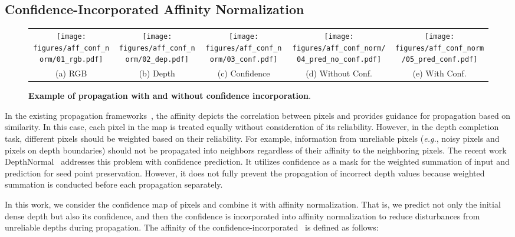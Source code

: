 \documentclass[runningheads]{llncs}
\newcommand{\eg}{\textit{e.g.}}
\newcommand{\csmall}{\fontsize{8}{9.5}\selectfont}
\newcommand{\tgAbsSumStar}{}
\begin{document}
\subsection{Confidence-Incorporated Affinity Normalization}
\label{subsec:conf_aff_norm}


\begin{figure*}[t]
\begin{center}
\begin{tabular}{@{}c@{\hskip 0.01\linewidth}c@{\hskip 0.01\linewidth}c@{\hskip 0.01\linewidth}c@{\hskip 0.01\linewidth}c}
\texttt{[image: figures/aff\_conf\_norm/01\_rgb.pdf]} &
\texttt{[image: figures/aff\_conf\_norm/02\_dep.pdf]} &
\texttt{[image: figures/aff\_conf\_norm/03\_conf.pdf]} &
\texttt{[image: figures/aff\_conf\_norm/04\_pred\_no\_conf.pdf]} &
\texttt{[image: figures/aff\_conf\_norm/05\_pred\_conf.pdf]} \\
{\csmall (a) RGB} & {\csmall (b) Depth} & {\csmall (c) Confidence} & {\csmall (d) Without Conf.} & {\csmall (e) With Conf.}
\end{tabular}
\caption{\textbf{Example of propagation with and without confidence incorporation}.
}
\label{fig:aff_conf_norm}
\end{center}
\end{figure*}

In the existing propagation frameworks~\cite{levin2006closed,saxena2006learning,krahenbuhl2011efficient,liu2015deep,liu2017learning,cheng2018depth}, the affinity depicts the correlation between pixels and provides guidance for propagation based on similarity. 
In this case, each pixel in the map is treated equally without consideration of its reliability.
However, in the depth completion task, different pixels should be weighted based on their reliability. 
For example, information from unreliable pixels (\eg, noisy pixels and pixels on depth boundaries) should not be propagated into neighbors regardless of their affinity to the neighboring pixels.
The recent work DepthNormal~\cite{xu2019depth} addresses this problem with confidence prediction. 
It utilizes confidence as a mask for the weighted summation of input and prediction for seed point preservation. 
However, it does not fully prevent the propagation of incorrect depth values because weighted summation is conducted before each propagation separately.


In this work, we consider the confidence map of pixels and combine it with affinity normalization.
That is, we predict not only the initial dense depth but also its confidence, and then the confidence is incorporated into affinity normalization to reduce disturbances from unreliable depths during propagation. 
The affinity of the confidence-incorporated \tgAbsSumStar~is defined as follows:
\end{document}
